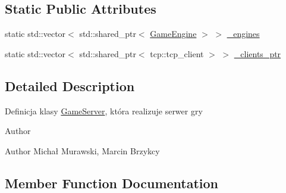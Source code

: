 \subsection*{Static Public Attributes}
\begin{DoxyCompactItemize}
\item 
static std\+::vector$<$ std\+::shared\+\_\+ptr$<$ \hyperlink{classGameEngine}{Game\+Engine} $>$ $>$ \hyperlink{classGameServer_a39f72d0082d78d1327b8c34b19c4aa66}{\+\_\+engines}
\item 
static std\+::vector$<$ std\+::shared\+\_\+ptr$<$ tcp\+::tcp\+\_\+client $>$ $>$ \hyperlink{classGameServer_abaa2e87ca0e4112c317a5d74d7f68be2}{\+\_\+clients\+\_\+ptr}
\end{DoxyCompactItemize}


\subsection{Detailed Description}
Definicja klasy \hyperlink{classGameServer}{Game\+Server}, która realizuje serwer gry \begin{DoxyAuthor}{Author}

\end{DoxyAuthor}
\begin{DoxyParagraph}{Author}
Michał Murawski, Marcin Brzykcy 
\end{DoxyParagraph}


\subsection{Member Function Documentation}

